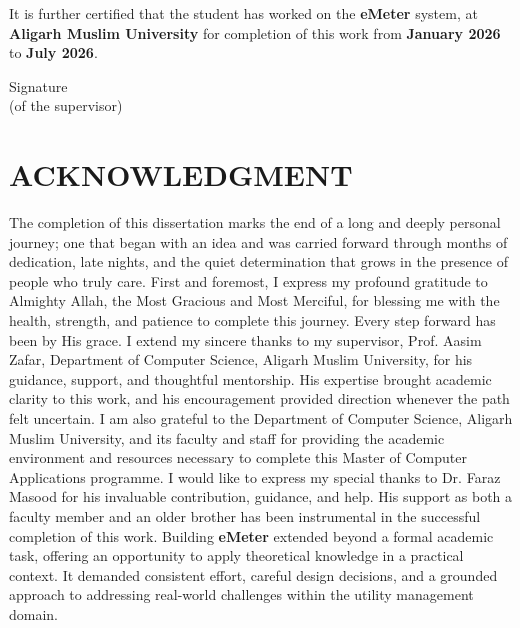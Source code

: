 \documentclass[12pt, a4paper, onecolumn]{report}
\begin{document}
It is further certified that the student has worked on the \textbf{eMeter} system, at \textbf{Aligarh Muslim University} for completion of this work from \textbf{January 2026} to \textbf{July 2026}.

\vspace{3cm}
\noindent
Signature \\
(of the supervisor) \\


\newpage
\chapter*{ACKNOWLEDGMENT}
The completion of this dissertation marks the end of a long and deeply personal journey; one that began with an idea and was carried forward through months of dedication, late nights, and the quiet determination that grows in the presence of people who truly care.
\vspace{1em}
First and foremost, I express my profound gratitude to Almighty Allah, the Most Gracious and Most Merciful, for blessing me with the health, strength, and patience to complete this journey. Every step forward has been by His grace.
\vspace{1em}
I extend my sincere thanks to my supervisor, Prof. Aasim Zafar, Department of Computer Science, Aligarh Muslim University, for his guidance, support, and thoughtful mentorship. His expertise brought academic clarity to this work, and his encouragement provided direction whenever the path felt uncertain.
\vspace{1em}
I am also grateful to the Department of Computer Science, Aligarh Muslim University, and its faculty and staff for providing the academic environment and resources necessary to complete this Master of Computer Applications programme.
\vspace{1em}
I would like to express my special thanks to Dr. Faraz Masood for his invaluable contribution, guidance, and help. His support as both a faculty member and an older brother has been instrumental in the successful completion of this work.
\vspace{1em}
Building \textbf{eMeter} extended beyond a formal academic task, offering an opportunity to apply theoretical knowledge in a practical context. It demanded consistent effort, careful design decisions, and a grounded approach to addressing real-world challenges within the utility management domain.
\end{document}
